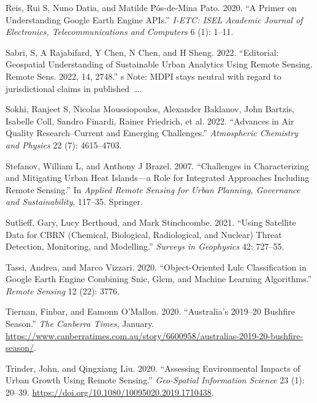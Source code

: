 \documentclass[
  letterpaper,
  DIV=11,
  numbers=noendperiod]{scrreprt}
\newlength{\cslhangindent}
\newlength{\cslentryspacingunit} %
\newenvironment{CSLReferences}[2] %
 {%
  \setlength{\parindent}{0pt}
  \ifodd #1
  \let\oldpar\par
  \def\par{\hangindent=\cslhangindent\oldpar}
  \fi
  \setlength{\parskip}{#2\cslentryspacingunit}
 }%
 {}
\begin{document}
\begin{CSLReferences}{1}{0}
\leavevmode{}%
Reis, Rui S, Nuno Datia, and Matilde Pós-de-Mina Pato. 2020. {``A Primer
on Understanding Google Earth Engine APIs.''} \emph{I-ETC: ISEL Academic
Journal of Electronics, Telecommunications and Computers} 6 (1): 1--11.

\leavevmode{}%
Sabri, S, A Rajabifard, Y Chen, N Chen, and H Sheng. 2022. {``Editorial:
Geospatial Understanding of Sustainable Urban Analytics Using Remote
Sensing. Remote Sens. 2022, 14, 2748.''} s Note: MDPI stays neutral with
regard to jurisdictional claims in published~\ldots.

\leavevmode{}%
Sokhi, Ranjeet S, Nicolas Moussiopoulos, Alexander Baklanov, John
Bartzis, Isabelle Coll, Sandro Finardi, Rainer Friedrich, et al. 2022.
{``Advances in Air Quality Research--Current and Emerging Challenges.''}
\emph{Atmospheric Chemistry and Physics} 22 (7): 4615--4703.

\leavevmode{}%
Stefanov, William L, and Anthony J Brazel. 2007. {``Challenges in
Characterizing and Mitigating Urban Heat Islands---a Role for Integrated
Approaches Including Remote Sensing.''} In \emph{Applied Remote Sensing
for Urban Planning, Governance and Sustainability}, 117--35. Springer.

\leavevmode{}%
Sutlieff, Gary, Lucy Berthoud, and Mark Stinchcombe. 2021. {``Using
Satellite Data for CBRN (Chemical, Biological, Radiological, and
Nuclear) Threat Detection, Monitoring, and Modelling.''} \emph{Surveys
in Geophysics} 42: 727--55.

\leavevmode{}%
Tassi, Andrea, and Marco Vizzari. 2020. {``Object-Oriented Lulc
Classification in Google Earth Engine Combining Snic, Glcm, and Machine
Learning Algorithms.''} \emph{Remote Sensing} 12 (22): 3776.

\leavevmode{}%
Tiernan, Finbar, and Eamonn O'Mallon. 2020. {``Australia's 2019--20
Bushfire Season.''} \emph{The Canberra Times}, January.
\url{https://www.canberratimes.com.au/story/6600958/australias-2019-20-bushfire-season/}.

\leavevmode{}%
Trinder, John, and Qingxiang Liu. 2020. {``Assessing Environmental
Impacts of Urban Growth Using Remote Sensing.''} \emph{Geo-Spatial
Information Science} 23 (1): 20--39.
\url{https://doi.org/10.1080/10095020.2019.1710438}.


\end{CSLReferences}
\end{document}
